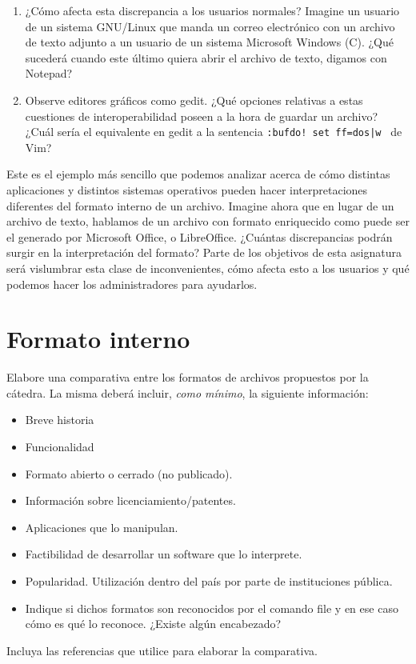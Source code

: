 \documentclass[12pt]{article}
\begin{document}
\begin{enumerate}
	\item ¿Cómo afecta esta discrepancia a los usuarios normales? Imagine un usuario de un 
	sistema GNU/Linux que manda un correo electrónico con un archivo de texto adjunto a un usuario de un 
	sistema Microsoft Windows (C). ¿Qué sucederá cuando este último quiera abrir el archivo 
	de texto, digamos con Notepad?
	\item Observe editores gráficos como gedit. ¿Qué opciones relativas a estas cuestiones de 
	interoperabilidad poseen a la hora de guardar un archivo? ¿Cuál sería el equivalente en  
	gedit a la sentencia {\tt :bufdo! set ff=dos|w } de Vim? 
\end{enumerate}
     
Este es el ejemplo más sencillo que podemos analizar acerca de cómo distintas aplicaciones y 
distintos sistemas operativos pueden hacer interpretaciones diferentes del formato interno de 
un archivo. Imagine ahora que en lugar de un archivo de texto, hablamos de un archivo con 
formato enriquecido como puede ser el generado por Microsoft Office, o LibreOffice. ¿Cuántas
discrepancias podrán surgir en la interpretación del formato? Parte de los objetivos de 
esta asignatura será vislumbrar esta clase de inconvenientes, cómo afecta esto a los usuarios y
qué podemos hacer los administradores para ayudarlos. 

\section*{Formato interno}

Elabore una comparativa entre los formatos de archivos propuestos por la 
cátedra. La misma deberá incluir, {\it como mínimo}, la siguiente información:
\begin{itemize} 
\item Breve historia
\item Funcionalidad
\item Formato abierto o cerrado (no publicado).
\item Información sobre licenciamiento/patentes.
\item Aplicaciones que lo manipulan. 
\item Factibilidad de desarrollar un software que lo interprete. 
\item Popularidad. Utilización dentro del país por parte de instituciones pública.  
\item Indique si dichos formatos son reconocidos por el comando file y en 
ese caso cómo es qué lo reconoce. ¿Existe algún encabezado?  
\end{itemize} 
Incluya las referencias que utilice para elaborar la comparativa. 
\end{document}
